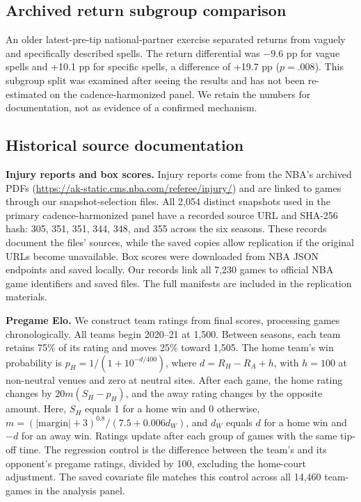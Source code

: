 \documentclass[11pt]{article}
\begin{document}
\FloatBarrier
\FloatBarrier
\subsection{Archived return subgroup comparison}
An older latest-pre-tip national-partner exercise separated returns from vaguely and specifically described spells. The return differential was $-9.6$ pp for vague spells and +10.1 pp for specific spells, a difference of +19.7 pp ($p=.008$). This subgroup split was examined after seeing the results and has not been re-estimated on the cadence-harmonized panel. We retain the numbers for documentation, not as evidence of a confirmed mechanism.

\subsection{Historical source documentation}\label{app:sources}

\noindent\textbf{Injury reports and box scores.} Injury reports come from the NBA's archived PDFs (\url{https://ak-static.cms.nba.com/referee/injury/}) and are linked to games through our snapshot-selection files. All 2,054 distinct snapshots used in the primary cadence-harmonized panel have a recorded source URL and SHA-256 hash: 305, 351, 351, 344, 348, and 355 across the six seasons. These records document the files' sources, while the saved copies allow replication if the original URLs become unavailable. Box scores were downloaded from NBA JSON endpoints and saved locally. Our records link all 7,230 games to official NBA game identifiers and saved files. The full manifests are included in the replication materials.

\noindent\textbf{Pregame Elo.} We construct team ratings from final scores, processing games chronologically. All teams begin 2020--21 at 1,500. Between seasons, each team retains 75\% of its rating and moves 25\% toward 1,505. The home team's win probability is $p_H=1/(1+10^{-d/400})$, where $d=R_H-R_A+h$, with $h=100$ at non-neutral venues and zero at neutral sites. After each game, the home rating changes by $20m(S_H-p_H)$, and the away rating changes by the opposite amount. Here, $S_H$ equals 1 for a home win and 0 otherwise, $m=(|\mathrm{margin}|+3)^{0.8}/(7.5+0.006d_W)$, and $d_W$ equals $d$ for a home win and $-d$ for an away win. Ratings update after each group of games with the same tip-off time. The regression control is the difference between the team's and its opponent's pregame ratings, divided by 100, excluding the home-court adjustment. The saved covariate file matches this control across all 14,460 team-games in the analysis panel.
\end{document}

